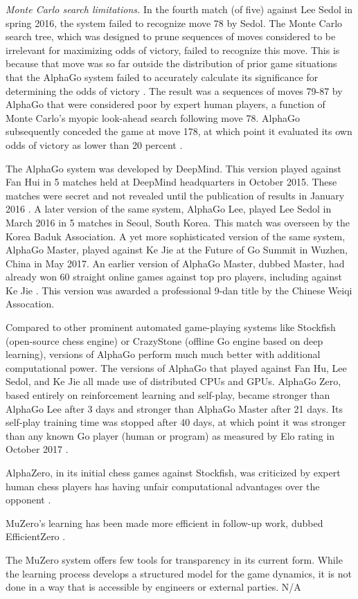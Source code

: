 \documentclass[12pt, a4paper, twocolumn]{article}
\begin{document}
{\textit{Monte Carlo search limitations.} In the fourth match (of five) against Lee Sedol in spring 2016, the system failed to recognize move 78 by Sedol. 
The Monte Carlo search tree, which was designed to prune sequences of moves considered to be irrelevant for maximizing odds of victory, failed to recognize this move.
This is because that move was so far outside the distribution of prior game situations that the AlphaGo system failed to accurately calculate its significance for determining the odds of victory \cite{montecarlo}. 
The result was a sequences of moves 79-87 by AlphaGo that were considered poor by expert human players, a function of Monte Carlo's myopic look-ahead search following move 78.
AlphaGo subsequently conceded the game at move 178, at which point it evaluated its own odds of victory as lower than 20 percent \cite{game4}.}

\Interfaces
{The AlphaGo system was developed by DeepMind.
This version played against Fan Hui in 5 matches held at DeepMind headquarters in October 2015.
These matches were secret and not revealed until the publication of results in January 2016 \cite{silver2016mastering}.
A later version of the same system, AlphaGo Lee, played Lee Sedol in March 2016 in 5 matches in Seoul, South Korea.
This match was overseen by the Korea Baduk Association.
A yet more sophisticated version of the same system, AlphaGo Master, played against Ke Jie at the Future of Go Summit in Wuzhen, China in May 2017.
An earlier version of AlphaGo Master, dubbed Master, had already won 60 straight online games against top pro players, including against Ke Jie \cite{master}.
This version was awarded a professional 9-dan title by the Chinese Weiqi Assocation.}
{Compared to other prominent automated game-playing systems like Stockfish (open-source chess engine) or CrazyStone (offline Go engine based on deep learning), versions of AlphaGo perform much much better with additional computational power.
The versions of AlphaGo that played against Fan Hu, Lee Sedol, and Ke Jie all made use of distributed CPUs and GPUs.
AlphaGo Zero, based entirely on reinforcement learning and self-play, became stronger than AlphaGo Lee after 3 days and stronger than AlphaGo Master after 21 days.
Its self-play training time was stopped after 40 days, at which point it was stronger than any known Go player (human or program) as measured by Elo rating in October 2017 \cite{master}.

AlphaZero, in its initial chess games against Stockfish, was criticized by expert human chess players has having unfair computational advantages over the opponent \cite{stockfish}.

MuZero's learning has been made more efficient in follow-up work, dubbed EfficientZero \cite{ye2021mastering}.}
{The MuZero system offers few tools for transparency in its current form. 
While the learning process develops a structured model for the game dynamics, it is not done in a way that is accessible by engineers or external parties.}
{N/A}
\end{document}
